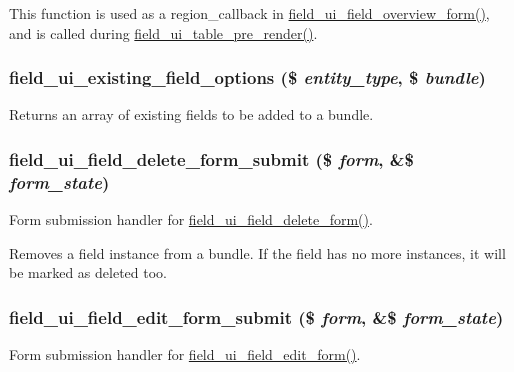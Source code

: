 This function is used as a region\_\-callback in \hyperlink{group__forms_gad62638f853fe251696eb3b57e8111845}{field\_\-ui\_\-field\_\-overview\_\-form()}, and is called during \hyperlink{field__ui_8admin_8inc_a3aaaf5a32e48e5cebdae7abb960fb0fc}{field\_\-ui\_\-table\_\-pre\_\-render()}. \hypertarget{field__ui_8admin_8inc_a982f82937a7a2baa0bbd6ad9ebe37ac6}{
\subsubsection[{field\_\-ui\_\-existing\_\-field\_\-options}]{\setlength{\rightskip}{0pt plus 5cm}field\_\-ui\_\-existing\_\-field\_\-options (\$ {\em entity\_\-type}, \/  \$ {\em bundle})}}
\label{field__ui_8admin_8inc_a982f82937a7a2baa0bbd6ad9ebe37ac6}
Returns an array of existing fields to be added to a bundle. \hypertarget{field__ui_8admin_8inc_a643ce47fcd5a52d15e79734b946da76e}{
\subsubsection[{field\_\-ui\_\-field\_\-delete\_\-form\_\-submit}]{\setlength{\rightskip}{0pt plus 5cm}field\_\-ui\_\-field\_\-delete\_\-form\_\-submit (\$ {\em form}, \/  \&\$ {\em form\_\-state})}}
\label{field__ui_8admin_8inc_a643ce47fcd5a52d15e79734b946da76e}
Form submission handler for \hyperlink{group__forms_gaaf4ce327f76bcd961e5de338558e704e}{field\_\-ui\_\-field\_\-delete\_\-form()}.

Removes a field instance from a bundle. If the field has no more instances, it will be marked as deleted too. \hypertarget{field__ui_8admin_8inc_a0d4cacca76203d4d7506dedc4781018e}{
\subsubsection[{field\_\-ui\_\-field\_\-edit\_\-form\_\-submit}]{\setlength{\rightskip}{0pt plus 5cm}field\_\-ui\_\-field\_\-edit\_\-form\_\-submit (\$ {\em form}, \/  \&\$ {\em form\_\-state})}}
\label{field__ui_8admin_8inc_a0d4cacca76203d4d7506dedc4781018e}
Form submission handler for \hyperlink{group__forms_ga11660e91b3649ff30bf665c00f1a9af2}{field\_\-ui\_\-field\_\-edit\_\-form()}.

